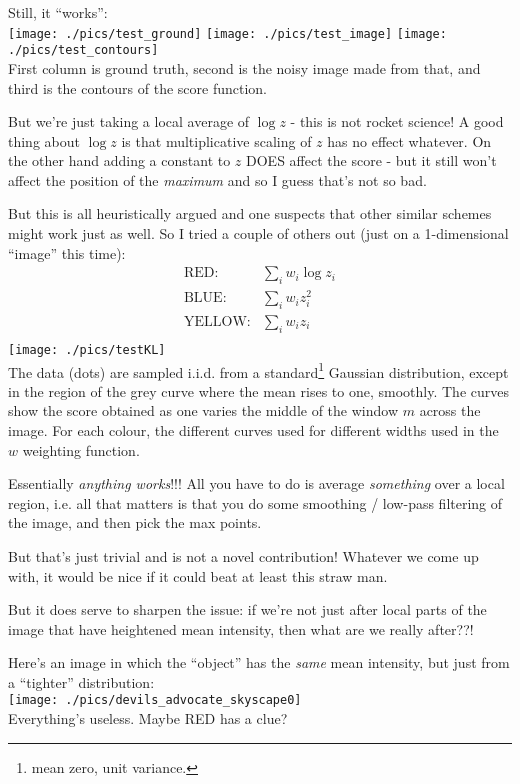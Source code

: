 \documentclass[11pt]{article}
\begin{document}
Still, it ``works'':\\
\texttt{[image: ./pics/test\_ground]}
\texttt{[image: ./pics/test\_image]}
\texttt{[image: ./pics/test\_contours]}\\
First column is ground truth, second is the noisy image made from that, and third is the contours of the score function.

But we're just taking a local average of $\log z$  - this is not rocket
science!  A good thing about $\log z$ is that multiplicative scaling of $z$
has no effect whatever.  On the other hand adding a constant to $z$
DOES affect the score - but it still won't affect the position of the
{\it maximum} and so I guess that's not so bad.  

But this is all heuristically argued and one suspects that other
similar schemes might work just as well. So I tried a couple of others
out (just on a 1-dimensional ``image'' this time):
\begin{align}
\text{RED:} & \sum_i w_i \log z_i \\
\text{BLUE:} & \sum_i w_i z_i^2 \\
\text{YELLOW:} & \sum_i w_i z_i \\
\end{align}
\texttt{[image: ./pics/testKL]}\\ The data (dots) are
sampled i.i.d. from a standard\footnote{mean zero, unit variance.}
Gaussian distribution, except in the region of the grey curve where
the mean rises to one, smoothly.  The curves show the score obtained
as one varies the middle of the window $m$ across the image.  For each
colour, the different curves used for different widths used in the $w$
weighting function.

Essentially {\it anything works}!!! All you have to do is average {\it
  something} over a local region, i.e. all that matters is that you do
some smoothing / low-pass filtering of the image, and then pick the
max points.

But that's just trivial and is not a novel contribution! Whatever we
come up with, it would be nice if it could beat at least this straw
man.

But it does serve to sharpen the issue: if we're not just after local parts of the image that have heightened mean intensity, then what are we really after??!

Here's an image in which the ``object'' has the {\it same} mean intensity, but just from a ``tighter'' distribution:\\
\texttt{[image: ./pics/devils\_advocate\_skyscape0]}\\
Everything's useless. Maybe RED has a clue?
\end{document}
